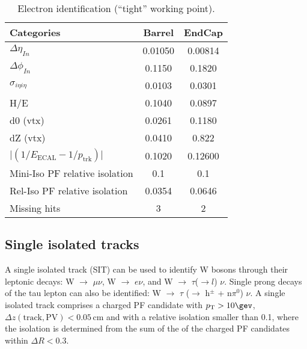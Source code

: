 \begin{table}[h!]
  \caption{Electron identification (``tight'' working point).\label{tab:ele-id}}
  \centering
  \footnotesize
  \begin{tabular}{ lcc }
    \hline
    \hline
    Categories                                               & Barrel    & EndCap    \\
    \hline
    $\Delta \eta_{In}$                                       & 0.01050   & 0.00814  \\
    $\Delta \phi_{In}$                                       & 0.1150    & 0.1820  \\
    $\sigma_{i\eta i\eta}$                                   & 0.0103    & 0.0301  \\
    H/E                                                      & 0.1040    & 0.0897   \\
    d0 (vtx)                                                 & 0.0261    & 0.1180  \\
    dZ (vtx)                                                 & 0.0410    & 0.822  \\
    $\lvert(1/E_{\textrm{ECAL}} - 1/p_{\textrm{trk}})\rvert$ & 0.1020     & 0.12600  \\
    Mini-Iso PF relative isolation                           & 0.1       & 0.1       \\
    Rel-Iso PF relative isolation                            & 0.0354    & 0.0646       \\
    Missing hits                                             & 3         & 2         \\
    \hline
    \hline
  \end{tabular}
  \end{table}


\subsection{Single isolated tracks}
\label{sec:SIT}

A single isolated track (SIT) can be used to identify W bosons through their leptonic decays: 
W $\rightarrow$ $\mu \nu$, W $\rightarrow$ $e\nu$, and W $\rightarrow$ $\tau$($\rightarrow l$) $\nu$. 
Single prong decays of the tau lepton can also be identified: W $\rightarrow$ $\tau$ ($\rightarrow$ h$^{\pm}$ + n$\pi^{0}$) $\nu$. 
A single isolated track comprises a charged PF candidate with $\Pt > 10 \gev$, $\Delta z(\mathrm{track}, \mathrm{PV}) < 0.05 \, \mathrm{cm}$ 
and with a relative isolation smaller than 0.1, where the isolation is determined from the sum 
of the \Pt of the charged PF candidates within $\Delta R < 0.3$.

